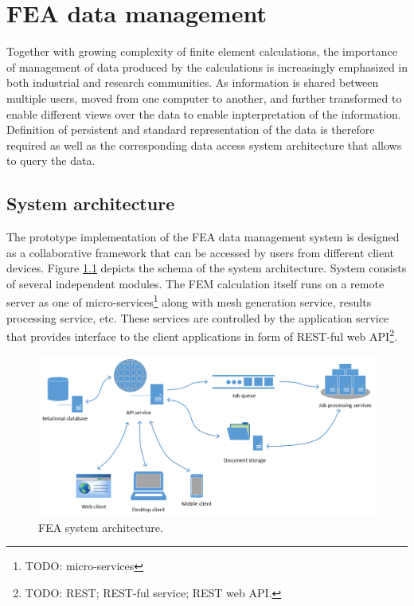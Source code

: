 \chapter{FEA data management}
\label{chapter:data-management}

Together with growing complexity of finite element calculations, the importance of management of data produced by the calculations is increasingly emphasized in both industrial and research communities. As information is shared between multiple users, moved from one computer to another, and further transformed to enable different views over the data to enable inpterpretation of the information. Definition of persistent and standard representation of the data is therefore required as well as the corresponding data access system architecture that allows to query the data.

\section{System architecture}
\label{sec:system-architecture}

The prototype implementation of the FEA data management system is designed as a collaborative framework that can be accessed by users from different client devices. Figure \ref{fig:FEA-architecture} depicts the schema of the system architecture. System consists of several independent modules. The FEM calculation itself runs on a remote server as one of micro-services\footnote{TODO: micro-services} along with mesh generation service, results processing service, etc. These services are controlled by the application service that provides interface to the client applications in form of REST-ful web API\footnote{TODO: REST; REST-ful service; REST web API.}.

\begin{figure}[H]
    \centering
    \includegraphics[width=\textwidth]{figures/chapter-data-management/FEA-architecture}
    \decoRule
    \caption{FEA system architecture.}
    \label{fig:FEA-architecture}
\end{figure}

